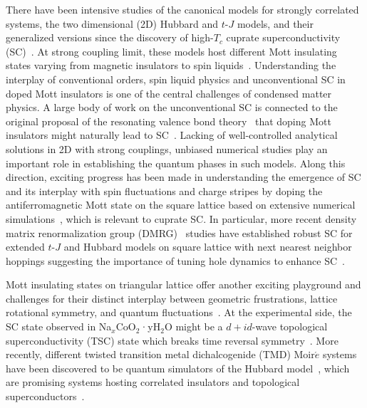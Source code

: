 \documentclass[aps,prx,reprint,superscriptaddress,showpacs]{revtex4-2}
\begin{document}
There have been intensive studies of the canonical models for  strongly correlated systems, the two dimensional (2D) Hubbard and $t$-$J$ models, and their generalized versions since the discovery of high-$T_c$  cuprate superconductivity (SC)~\cite{anderson1987resonating,lee2006doping,keimer2015quantum,proust2019remarkable,ogata2008t,fradkin2015colloquium,arovas2022hubbard}.
At strong coupling limit, these models host different  Mott insulating states varying from  magnetic insulators to spin liquids~\cite{balents2010spin}. 
Understanding the interplay of conventional orders, spin liquid physics and unconventional SC in doped  Mott insulators  is one of the central
challenges of condensed matter physics.
A large  body of work on  the unconventional SC is connected to  the  original proposal of the resonating valence bond theory~\cite{anderson1987resonating} that doping  Mott insulators might naturally lead to SC~\cite{senthil2005cup,lee2006doping,ogata2008t,fradkin2015colloquium,weng1999mean,song2021doping}.
Lacking of well-controlled analytical solutions in 2D with strong couplings, unbiased numerical studies play an important role in establishing the quantum phases in such models.  
Along this direction, exciting progress has been made in understanding the emergence of SC  and its interplay with spin fluctuations and charge stripes by doping the antiferromagnetic Mott state on the square lattice based on extensive numerical simulations~\cite{white2009pairing,corboz2014competing,PhysRevX.5.041041,jiang2019superconductivity,qin2020,zheng2017stripe,jiang2018superconductivity,dodaro2017intertwined,jiang2020ground,PhysRevLett.127.097002,gong2021robust,jiang2021ground}, which is relevant to cuprate SC.
In particular, more recent density matrix renormalization group (DMRG)~\cite{white1992density} studies have established robust SC for extended $t$-$J$ and Hubbard models on square lattice with next nearest neighbor hoppings suggesting the importance of tuning hole dynamics to enhance SC~\cite{jiang2019superconductivity,PhysRevLett.127.097002,gong2021robust,jiang2021ground}. 

Mott insulating states on triangular lattice offer another exciting playground and challenges for their distinct interplay between geometric frustrations, lattice rotational symmetry,  and quantum fluctuations~\cite{baskaran2003electronic,kumar2003superconductivity,wang2004doped,motrunich2004,raghu2010superconductivity,chen2013unconventional,venderley2019density,jiang2020topological,song2021doping,jiang2021superconductivity,zhu2022doped,arovas2022hubbard,gannot2020SU,szasz2020chiral,chen2021quantum,peng2021gapless,wietek2021,aghaei2020efficient}. 
At the experimental side, the SC state observed in Na$_x$CoO$_2$·yH$_2$O might be a $d+id$-wave topological superconductivity (TSC) state which breaks time reversal symmetry~\cite{takada2003superconductivity,zhou2008nodal}. More recently, different twisted transition metal dichalcogenide (TMD) Moir$\acute{e}$ systems have been discovered to be quantum simulators of the Hubbard model~\cite{wu2018hubbard,Tang2020},  which are promising systems  hosting  correlated insulators and topological superconductors~\cite{an2020interaction,schrade2021nematic,scherer2021mathcal}.
\end{document}
